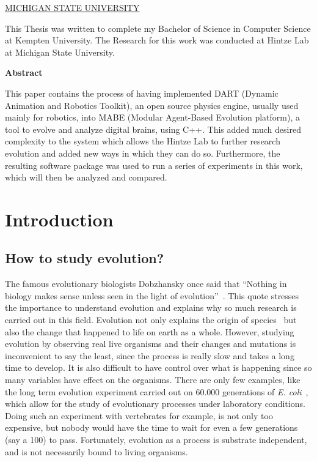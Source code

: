 \documentclass[12pt,oneside,listof=totoc,paper=a4,headings=small]{scrbook}
\begin{document}
\newpage
\vspace*{0.5cm}
\begin{center}
{\Large \color{OliveGreen} \underline {MICHIGAN STATE UNIVERSITY}}
\end{center}
\centering This Thesis was written to complete my Bachelor of Science in Computer Science at Kempten University. The Research for this work was conducted at Hintze Lab at Michigan State University.

\newpage

\vspace*{1cm}

\begin{center}
    \textbf{Abstract}
\end{center}

\vspace*{1cm}

\noindent
This paper contains the process of having implemented DART (Dynamic Animation and Robotics Toolkit), an open source physics engine, usually used mainly for robotics, into MABE (Modular Agent-Based Evolution platform), a tool to evolve and analyze digital brains, using C++. This added much desired complexity to the system which allows the Hintze Lab to further research evolution and added new ways in which they can do so. Furthermore, the resulting software package was used to run a series of experiments in this work, which will then be analyzed and compared.


\tableofcontents
\listoffigures
\lstlistoflistings
\listoftables

\clearpage
\mainmatter
\setcounter{page}{1}

\chapter{Introduction}
\section{How to study evolution?}
The famous evolutionary biologists Dobzhansky once said that ``Nothing in biology makes sense unless seen in the light of evolution''~\cite{dobzhansky2013nothing}. This quote stresses the importance to understand evolution and explains why so much research is carried out in this field. Evolution not only explains the origin of species~\cite{darwin2004origin} but also the change that happened to life on earth as a whole. However, studying evolution by observing real live organisms and their changes and mutations is inconvenient to say the least, since the process is really slow and takes a long time to develop. It is also difficult to have control over what is happening since so many variables have effect on the organisms. There are only few examples, like the long term evolution experiment carried out on 60.000 generations of \textit{E. coli}~\cite{lenski2003evolutionary}, which allow for the study of evolutionary processes under laboratory conditions. Doing such an experiment with vertebrates for example, is not only too expensive, but nobody would have the time to wait for even a few generations (say a 100) to pass. Fortunately, evolution as a process is substrate independent, and is not necessarily bound to living organisms.
\end{document}
